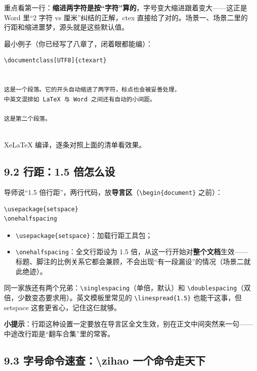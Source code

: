 重点看第一行：\textbf{缩进两字符是按“字符”算的}，字号变大缩进跟着变大——这正是 Word 里“2 字符 vs 厘米”纠结的正解，ctex 直接给了对的。场景一、场景二里的行距和缩进噩梦，源头就是这些默认值。

最小例子（你已经写了八章了，闭着眼都能编）：

\begin{lstlisting}
\documentclass[UTF8]{ctexart}


这是一个段落。它的开头自动缩进了两字符，标点也会被妥善处理，
中英文混排如 LaTeX 与 Word 之间还有自动的小间距。

这是第二个段落。


\end{lstlisting}

XeLaTeX 编译，逐条对照上面的清单看效果。

\subsection*{9.2 行距：1.5 倍怎么设}

导师说“1.5 倍行距”，两行代码，放\textbf{导言区}（\texttt{\textbackslash{}begin\{document\}} 之前）：

\begin{lstlisting}
\usepackage{setspace}
\onehalfspacing
\end{lstlisting}

\begin{itemize}
\setlength{\itemsep}{2pt}
\item \texttt{\textbackslash{}usepackage\{setspace\}}：加载行距工具包；
\item \texttt{\textbackslash{}onehalfspacing}：全文行距设为 1.5 倍，从这一行开始对\textbf{整个文档}生效——标题、脚注的比例关系它都会兼顾，不会出现“有一段漏设”的情况（场景二就此绝迹）。
\end{itemize}

同一家族还有两个兄弟：\texttt{\textbackslash{}singlespacing}（单倍，默认）和 \texttt{\textbackslash{}doublespacing}（双倍，少数变态要求用）。英文模板里常见的 \texttt{\textbackslash{}linespread\{1.5\}} 也能干这事，但 setspace 这套更省心，记住这仨就够。

\begin{notebox}
\textbf{小提示}：行距这种设置一定要放在导言区全文生效，别在正文中间突然来一句——中途改行距是“翻车合集”里的常客。
\end{notebox}

\subsection*{9.3 字号命令速查：\textbackslash{}zihao 一个命令走天下}

